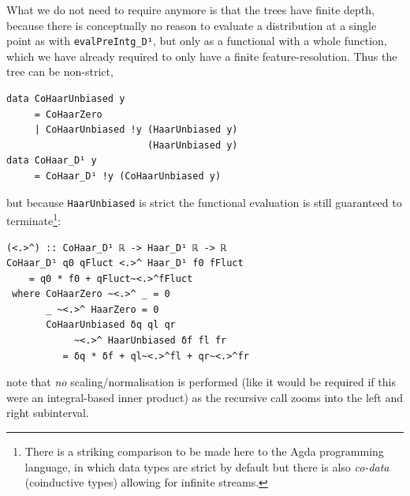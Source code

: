 \documentclass[sigplan,review,anonymous]{acmart}\settopmatter{printfolios=true,printccs=false,printacmref=false}
\begin{document}
What we do not need to require anymore is that the trees have finite depth, because there is conceptually no reason to evaluate a distribution at a single point as with \lstinline`evalPreIntg_D¹`, but only as a functional with a whole function, which we have already required to only have a finite feature-resolution. Thus the tree can be non-strict,
\begin{lstlisting}
data CoHaarUnbiased y
     = CoHaarZero
     | CoHaarUnbiased !y (HaarUnbiased y)
                         (HaarUnbiased y)
data CoHaar_D¹ y
     = CoHaar_D¹ !y (CoHaarUnbiased y)
\end{lstlisting}
but because \lstinline`HaarUnbiased` is strict the functional evaluation is still guaranteed to terminate\footnote{%
There is a striking comparison to be made here to the Agda programming language, in which data types are strict by default but there is also \emph{co-data} (coinductive types) allowing for infinite streams.
}:
\begin{lstlisting}
(<.>^) :: CoHaar_D¹ ℝ -> Haar_D¹ ℝ -> ℝ
CoHaar_D¹ q0 qFluct <.>^ Haar_D¹ f0 fFluct
    = q0 * f0 + qFluct~<.>^fFluct
 where CoHaarZero ~<.>^ _ = 0
       _ ~<.>^ HaarZero = 0
       CoHaarUnbiased δq ql qr
            ~<.>^ HaarUnbiased δf fl fr
          = δq * δf + ql~<.>^fl + qr~<.>^fr
\end{lstlisting}
note that \emph{no} scaling/normalisation is performed (like it would be required if this were an integral-based inner product) as the recursive call zooms into the left and right subinterval.
\end{document}
